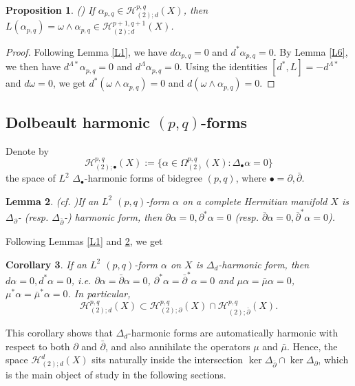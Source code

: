 \documentclass[12pt, twoside]{article}
\newtheorem{theorem}{Theorem}[section]
\newtheorem{corollary}[theorem]{Corollary}
\newtheorem{lemma}[theorem]{Lemma}
\newtheorem{proposition}[theorem]{Proposition}
\theoremstyle{definition}
\numberwithin{equation}{section}
\def \a {\alpha }
\def \De {\Delta}
\def \La {\Lambda}
\def\w {\omega}
\def\Om{\Omega}
\def\pa{\partial}
\begin{document}
	\begin{proposition}\label{P1}(\cite[Lemma 2.2]{CW20})
		If $\a_{p,q}\in\mathcal{H}^{p,q}_{(2);d}(X)$, then $L(\a_{p,q})=\w\wedge\a_{p,q}\in\mathcal{H}^{p+1,q+1}_{(2);d}(X)$.
	\end{proposition}
	\begin{proof}
		Following Lemma \ref{L1}, we have $d\a_{p,q}=0$ and $d^{\ast}\a_{p,q}=0$. By Lemma \ref{L6}, we then have $d^{\La\ast}\a_{p,q}=0$ and $d^{\La}\a_{p,q}=0$. Using the identities $[d^{\ast},L]=-d^{\La\ast}$ and $d\w=0$, we get $d^{\ast}(\w\wedge\a_{p,q})=0$ and $d(\w\wedge\a_{p,q})=0$.
	\end{proof}
	
	
	
	\subsection{Dolbeault harmonic $(p,q)$-forms}
	Denote by
	$$\mathcal{H}^{p,q}_{(2);\bullet}(X):=\{\a\in\Om^{p,q}_{(2)}(X):\De_{\bullet}\a=0 \} $$
	the space of $L^{2}$ $\De_{\bullet}$-harmonic forms of bidegree $(p,q)$, where $\bullet=\pa,\bar{\pa}$.
	\begin{lemma}(cf. \cite[Lemma3.3]{Hua22})\label{L5}
		If an $L^{2}$ $(p, q)$-form $\a$ on  a complete Hermitian manifold $X$ is $\De_{\pa}$- (resp. $\De_{\bar{\pa}}$-) harmonic form, then $\pa\a=0,\pa^{\ast}\a=0$ (resp. $\bar{\pa}\a=0,\bar{\pa}^{\ast}\a=0$).	
	\end{lemma}
	Following Lemmas \ref{L1} and \ref{L5}, we get
	\begin{corollary}\label{C4}
		If an $L^{2}$ $(p,q)$-form $\a$ on $X$ is $\De_{d}$-harmonic form, then $d\a=0,d^{\ast}\a=0$, i.e. $\pa\a=\bar{\pa}\a=0$, $\pa^{\ast}\a=\bar{\pa}^{\ast}\a=0$ and $\mu\a=\bar{\mu}\a=0$, $\mu^{\ast}\a=\bar{\mu}^{\ast}\a=0$. In particular, $$\mathcal{H}^{p,q}_{(2);d}(X)\subset\mathcal{H}^{p,q}_{(2);\pa}(X)\cap\mathcal{H}^{p,q}_{(2);\bar{\pa}}(X).$$
	\end{corollary}
This corollary shows that $\De_{d}$-harmonic forms are automatically harmonic with respect to both $\pa$ and $\bar{\pa}$, and also annihilate the operators $\mu$ and $\bar{\mu}$. Hence, the space $\mathcal{H}^{d}_{(2);d}(X)$ sits naturally inside the intersection $\ker{\De_{\bar{\pa}}}\cap\ker\De_{\pa}$, which is the main object of study in the following sections.
	
\end{document}
